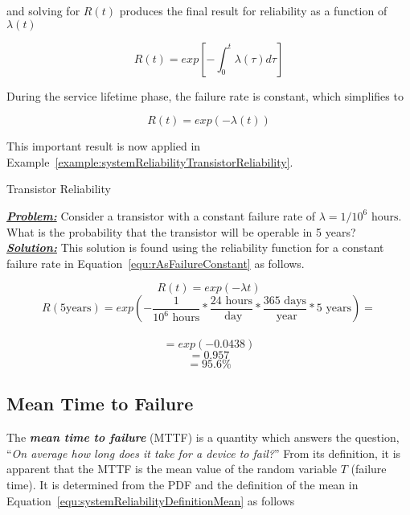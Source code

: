 {and solving for $R(t)$ produces the final result for reliability as
a function of $\lambda(t)$ 

\begin{equation}
\label{equ:rAsFunctionOfLambda}
R(t) = exp [ - \int^t_0\lambda(\tau) d\tau ]
\end{equation}

During the service lifetime phase, the failure rate is constant, which
simplifies to

\begin{equation}
\label{equ:rAsFailureConstant}
R(t) = exp (- \lambda(t))
\end{equation}

This important result is now applied in 
Example~\ref{example:systemReliabilityTransistorReliability}.

\begin{example}{Transistor Reliability}
\label{example:systemReliabilityTransistorReliability}

\emph{\textbf{\ul{Problem:}}} Consider a transistor with a constant
failure rate of $\lambda = 1/10^6 \text{ hours}$. What is the
probability that the transistor will be operable in 5 years? \\

\noindent\emph{\textbf{\ul{Solution:}}} This solution is found using the
reliability function for a constant failure rate in 
Equation~\ref{equ:rAsFailureConstant} as follows.

$$R(t) = exp(-\lambda t)  $$
$$R(5 \text{years}) = exp( - \frac{1}{10^6 \text{ hours}} * \frac{24 \text{ hours}}{\text{ day}} * \frac{365 \text{ days}}{\text{ year}} * 5 \text{ years} ) = $$\\
$$			= exp(-0.0438) $$ 
$$			= 0.957 $$
$$			= 95.6 \% $$
\end{example}

\subsection{Mean Time to Failure}
\label{subsection:mean-time-to-failure}

The \emph{\textbf{mean time to failure}} (MTTF) is a quantity which
answers the question, ``\emph{On average how long does it take for a
device to fail?}'' From its definition, it is apparent that the MTTF is
the mean value of the random variable $T$ (failure time). It is
determined from the PDF and the definition of the mean in 
Equation~\ref{equ:systemReliabilityDefinitionMean} as follows
 
}
